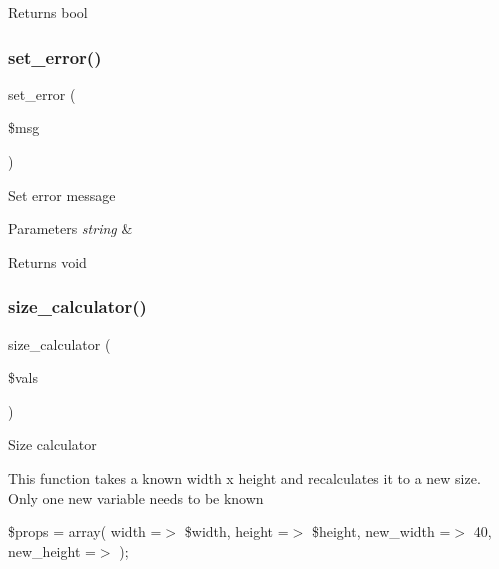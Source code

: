 \begin{DoxyReturn}{Returns}
bool 
\end{DoxyReturn}
\mbox{\label{class_c_i___image__lib_a892f1ba7cba3731a3fc68f1f64e92610}} 
\subsubsection{\texorpdfstring{set\+\_\+error()}{set\_error()}}
{\footnotesize\ttfamily set\+\_\+error (\begin{DoxyParamCaption}\item[{}]{\$msg }\end{DoxyParamCaption})}

Set error message


\begin{DoxyParams}{Parameters}
{\em string} & \\
\hline
\end{DoxyParams}
\begin{DoxyReturn}{Returns}
void 
\end{DoxyReturn}
\mbox{\label{class_c_i___image__lib_a827549db4de2281a8f2b35ada2ef3909}} 
\subsubsection{\texorpdfstring{size\+\_\+calculator()}{size\_calculator()}}
{\footnotesize\ttfamily size\+\_\+calculator (\begin{DoxyParamCaption}\item[{}]{\$vals }\end{DoxyParamCaption})}

Size calculator

This function takes a known width x height and recalculates it to a new size. Only one new variable needs to be known

\$props = array( \textquotesingle{}width\textquotesingle{} =$>$ \$width, \textquotesingle{}height\textquotesingle{} =$>$ \$height, \textquotesingle{}new\+\_\+width\textquotesingle{} =$>$ 40, \textquotesingle{}new\+\_\+height\textquotesingle{} =$>$ \textquotesingle{}\textquotesingle{} );


